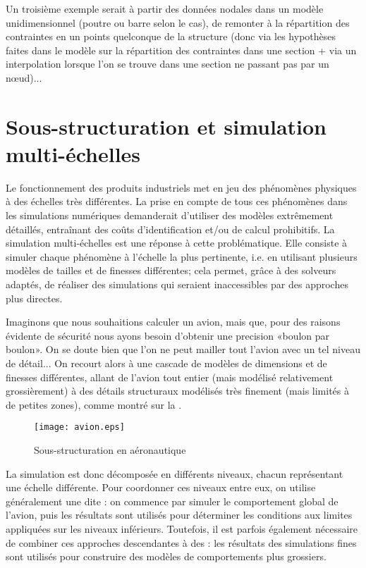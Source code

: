 \medskip
Un troisième exemple serait à partir des données nodales dans un modèle unidimensionnel (poutre ou barre selon le cas), de remonter à la répartition des contraintes en un points quelconque de la structure (donc via les hypothèses faites dans le modèle sur la répartition des contraintes dans une section + via un interpolation lorsque l'on se trouve dans une section ne passant pas par un nœud)...



\medskip
\section{Sous-structuration et simulation multi-échelles}\label{Sec-ssstruc}

Le fonctionnement des produits industriels met en jeu des phénomènes physiques à des échelles très différentes. La prise en compte de tous ces phénomènes dans les simulations numériques demanderait d'utiliser des modèles extrêmement détaillés, entraînant des coûts d'identification et/ou de calcul prohibitifs. La simulation multi-échelles est une réponse à cette problématique. Elle consiste à simuler chaque phénomène à l'échelle la plus pertinente, i.e. en utilisant plusieurs modèles de tailles et de finesses différentes; cela permet, grâce à des solveurs adaptés, de réaliser des simulations qui seraient inaccessibles par des approches plus directes.

\medskip
Imaginons que nous souhaitions calculer un avion, mais que, pour des raisons évidente de sécurité nous ayons besoin d'obtenir une precision «boulon par boulon». On se doute bien que l'on ne peut mailler tout l'avion avec un tel niveau de détail... On recourt alors à une cascade de modèles de dimensions et de finesses différentes, allant de l'avion tout entier (mais modélisé relativement grossièrement) à des détails structuraux modélisés très finement (mais limités à de petites zones), comme montré sur la .
\begin{figure}[ht]
\centering\texttt{[image: avion.eps]}
\caption{Sous-structuration en aéronautique}\label{Fig-avion}
\end{figure}

La simulation est donc décomposée en différents niveaux, chacun représentant une échelle différente. Pour coordonner ces niveaux entre eux, on utilise généralement une  dite : on commence par simuler le comportement global de l'avion, puis les résultats sont utilisés pour déterminer les conditions aux limites appliquées sur les niveaux inférieurs. Toutefois, il est parfois également nécessaire de combiner ces approches descendantes
à des : les résultats des simulations fines sont utilisés pour construire des modèles de comportements plus grossiers.

